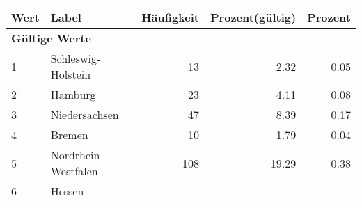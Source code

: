      \begin{longtable}{lXrrr}
     \toprule
     \textbf{Wert} & \textbf{Label} & \textbf{Häufigkeit} & \textbf{Prozent(gültig)} & \textbf{Prozent} \\
     \endhead
     \midrule
     \multicolumn{5}{l}{\textbf{Gültige Werte}}\\

     1 &
     \multicolumn{1}{X}{ Schleswig-Holstein   } &


       \num{13} &
       \num[round-mode=places,round-precision=2]{2.32} &
         \num[round-mode=places,round-precision=2]{0.05} \\

     2 &
     \multicolumn{1}{X}{ Hamburg   } &


       \num{23} &
       \num[round-mode=places,round-precision=2]{4.11} &
         \num[round-mode=places,round-precision=2]{0.08} \\

     3 &
     \multicolumn{1}{X}{ Niedersachsen   } &


       \num{47} &
       \num[round-mode=places,round-precision=2]{8.39} &
         \num[round-mode=places,round-precision=2]{0.17} \\

     4 &
     \multicolumn{1}{X}{ Bremen   } &


       \num{10} &
       \num[round-mode=places,round-precision=2]{1.79} &
         \num[round-mode=places,round-precision=2]{0.04} \\

     5 &
     \multicolumn{1}{X}{ Nordrhein-Westfalen   } &


       \num{108} &
       \num[round-mode=places,round-precision=2]{19.29} &
         \num[round-mode=places,round-precision=2]{0.38} \\

     6 &
     \multicolumn{1}{X}{ Hessen   } &



\end{longtable}
